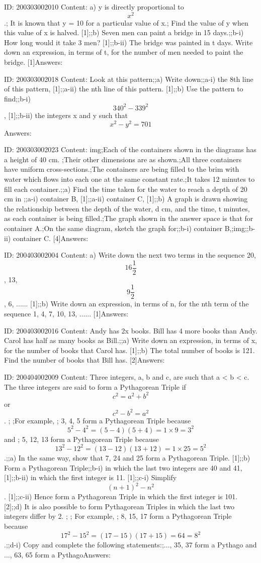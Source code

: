 \documentclass{article}
\begin{document}
ID: 200303002010
Content:
a) y is directly proportional to $$x^2$$.; It is known that y = 10 for a particular value of x.; Find the value of y when this value of x is halved.   [1];;b) Seven men can paint a bridge in 15 days.;;b-i) How long would it take 3 men?   [1];;b-ii) The bridge was painted in t days. Write down an expression, in terms of t, for the number of men needed to paint the bridge.   [1]Answers:

ID: 200303002018
Content:
Look at this pattern;;a) Write down;;a-i) the 8th line of this pattern,   [1];;a-ii) the nth line of this pattern.   [1];;b) Use the pattern to find;;b-i) $$340^2 - 339^2$$,   [1];;b-ii) the integers x and y such that $$x^2-y^2=701$$ Answers:

ID: 200303002023
Content:
img;Each of the containers shown in the diagrams has a height of 40 cm. ;Their other dimensions are as shown.;All three containers have uniform cross-sections.;The containers are being filled to the brim with water which flows into each one at the same constant rate.;It takes 12 minutes to fill each container.;;a) Find the time taken for the water to reach a depth of 20 cm in ;;a-i) container B,   [1];;a-ii) container C,   [1];;b) A graph is drawn showing the relationship between the depth of the water, d cm, and the time, t minutes, as each container is being filled.;The graph shown in the answer space is that for container A.;On the same diagram, sketch the graph for;;b-i) container B,;img;;b-ii) container C.   [4]Answers:

ID: 200403002004
Content:
a) Write down the next two terms in the sequence 20, $$16\frac{1}{2}$$, 13, $$9\frac{1}{2}$$, 6, ...... [1];;b) Write down an expression, in terms of n, for the nth term of the sequence 1, 4, 7, 10, 13, ......  [1]Answers:

ID: 200403002016
Content:
Andy has 2x books. Bill has 4 more books than Andy. Carol has half as many books as Bill.;;a) Write down an expression, in terms of x, for the number of books that Carol has. [1];;b) The total number of books is 121. Find the number of books that Bill has. [2]Answers:

ID: 200404002009
Content:
Three integers, a, b and c, are such that a < b < c. The three integers are said to form a Pythagorean Triple if $$c^{2} =a^{2} +b^{2} $$ or $$c^{2} -b^{2} =a^{2} $$. ; ;For example, ; 3, 4, 5 form a Pythagorean Triple because $$5^{2} -4^{2}  =(5-4)(5+4)= 1 \times 9=3^{2} $$ and ; 5, 12, 13 form a Pythagorean Triple because $$13^{2} -12^{2} =(13-12)(13+12)=1 \times 25 =5^{2} $$.;;a) In the same way, show that 7, 24 and 25 form a Pythagorean Triple. [1];;b) Form a Pythagorean Triple;;b-i) in which the last two integers are 40 and 41, [1];;b-ii) in which the first integer is 11. [1];;c-i) Simplify $$(n+1)^{2} -n^{2} $$. [1];;c-ii) Hence form a Pythagorean Triple in which the first integer is 101. [2];;d) It is also possible to form Pythagorean Triples in which the last two integers differ by 2. ; ; For example, ; 8, 15, 17 form a Pythagorean Triple because $$17^{2} -15^{2} =(17-15)(17+15)=64=8^{2} $$.;;d-i) Copy and complete the following statements:;..., 35, 37 form a Pythago and ..., 63, 65 form a PythagoAnswers:
\end{document}
